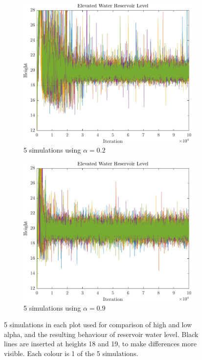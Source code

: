 \begin{figure}
	\centering
	\begin{subfigure}{.5\textwidth}
		\centering
		\includegraphics[width=1\linewidth]{figures/ConvergenceHeight02.pdf}
		\caption{5 simulations using $\alpha = 0.2$}
		\label{fig:5sims1}
	\end{subfigure}%
	\begin{subfigure}{.5\textwidth}
		\centering
		\includegraphics[width=1\linewidth]{figures/ConvergenceHeight09.pdf}
		\caption{5 simulations using $\alpha = 0.9$}
		\label{fig:5sims2}
	\end{subfigure}
	\caption{5 simulations in each plot used for comparison of high and low alpha, and the resulting behaviour of reservoir water level. Black lines are inserted at heights 18 and 19, to make differences more visible. Each colour is 1 of the 5 simulations.}
	\label{fig:QConvergenceBehavior}
\end{figure}

